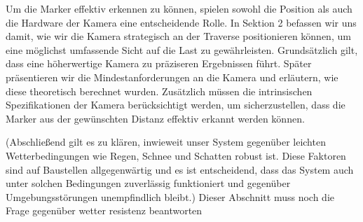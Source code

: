 Um die Marker effektiv erkennen zu können, spielen sowohl die Position als auch die Hardware der Kamera eine entscheidende Rolle. In Sektion 2 befassen wir uns damit, wie wir die Kamera strategisch an der Traverse positionieren können, um eine möglichst umfassende Sicht auf die Last zu gewährleisten. Grundsätzlich gilt, dass eine höherwertige Kamera zu präziseren Ergebnissen führt. Später präsentieren wir die Mindestanforderungen an die Kamera und erläutern, wie diese theoretisch berechnet wurden. Zusätzlich müssen die intrinsischen Spezifikationen der Kamera berücksichtigt werden, um sicherzustellen, dass die Marker aus der gewünschten Distanz effektiv erkannt werden können.


(Abschließend gilt es zu klären, inwieweit unser System gegenüber leichten Wetterbedingungen wie Regen, Schnee und Schatten robust ist. Diese Faktoren sind auf Baustellen allgegenwärtig und es ist entscheidend, dass das System auch unter solchen Bedingungen zuverlässig funktioniert und gegenüber Umgebungsstörungen unempfindlich bleibt.) Dieser Abschnitt muss noch die Frage gegenüber wetter resistenz beantworten